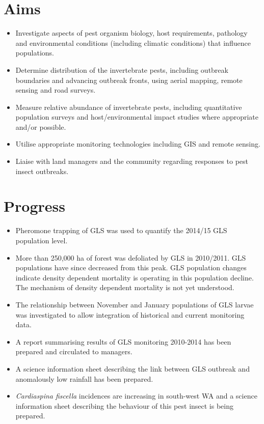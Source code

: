 \documentclass[version=last, 
    paper=a4, %
    10pt, %
    usenames,
    dvipsnames, 
    oneside, %
    headings=openany, %
    DIV=15 %
]{scrbook}
\begin{document}
\section*{Aims}
\begin{itemize}
\itemsep1pt\parskip0pt
\item
  Investigate aspects of pest organism biology, host requirements,
  pathology and environmental conditions (including climatic conditions)
  that influence populations.
\item
  Determine distribution of the invertebrate pests, including outbreak
  boundaries and advancing outbreak fronts, using aerial mapping, remote
  sensing and road surveys.
\item
  Measure relative abundance of invertebrate pests, including
  quantitative population surveys and host/environmental impact studies
  where appropriate and/or possible.
\item
  Utilise appropriate monitoring technologies including GIS and remote
  sensing.
\item
  Liaise with land managers and the community regarding responses to
  pest insect outbreaks.
\end{itemize}



\section*{Progress}
\begin{itemize}
\itemsep1pt\parskip0pt
\item
  Pheromone trapping of GLS was used to quantify the 2014/15 GLS
  population level.
\item
  More than 250,000 ha of forest was defoliated by GLS in 2010/2011. GLS
  populations have since decreased from this peak. GLS population
  changes indicate density dependent mortality is operating in this
  population decline. The mechanism of density dependent mortality is
  not yet understood.
\item
  The relationship between November and January populations of GLS
  larvae was investigated to allow integration of historical and current
  monitoring data.
\item
  A report summarising results of GLS monitoring 2010-2014 has been
  prepared and circulated to managers.
\item
  A science information sheet describing the link between GLS outbreak
  and anomalously low rainfall has been prepared.
\item
  \emph{Cardiaspina fiscella} incidences are increasing in south-west WA
  and a science information sheet describing the behaviour of this pest
  insect is being prepared.
\end{itemize}
\end{document}
